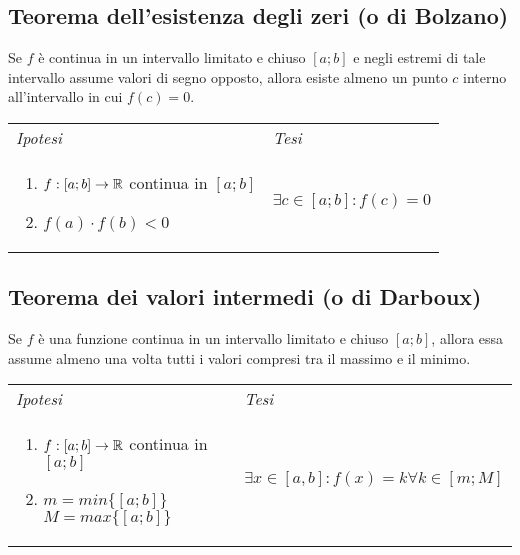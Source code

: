     \subsection{Teorema dell'esistenza degli zeri (o di Bolzano)}
        \begin{shadedTheorem}[Bolzano]
            Se $f$ è continua in un intervallo limitato e chiuso $[a;b]$ e negli estremi di tale intervallo assume valori di segno opposto, allora esiste almeno un punto $c$ interno all'intervallo in cui $f(c)=0$.
        \end{shadedTheorem}
        \begin{tabular}{m{}m{}}
            \textit{Ipotesi} & \textit{Tesi}  \\
            \begin{enumerate}
                \item $f: [a;b] \to \mathbb{R}$ continua in $[a;b]$
                \item $f(a) \cdot f(b)<0$
            \end{enumerate} & $\exists c \in [a;b]:f(c)=0$ 
        \end{tabular}
    
    \subsection{Teorema dei valori intermedi (o di Darboux)}
        \begin{shadedTheorem}[Darbaux]
            Se $f$ è una funzione continua in un intervallo limitato e chiuso $[a;b]$, allora essa assume almeno una volta tutti i valori compresi tra il massimo e il minimo.
        \end{shadedTheorem}
        \begin{tabular}{m{}m{}}
            \textit{Ipotesi} & \textit{Tesi}  \\
            \begin{enumerate}
                \item $f: [a;b]\to \mathbb{R}$ continua in $[a;b]$
                \item $m=min\{[a;b]\}$ ~~~ $M=max\{[a;b]\}$
            \end{enumerate} & $\exists x \in [a,b] : f(x)=k \forall k \in [m;M]$
        \end{tabular}
